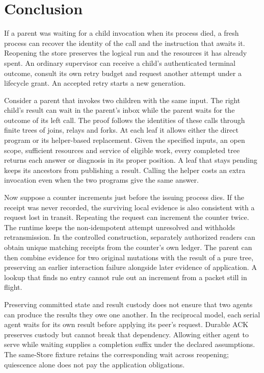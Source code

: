 \documentclass[11pt,a4paper]{article}
\theoremstyle{definition}
\theoremstyle{remark}
\begin{document}
\section{Conclusion}
If a parent was waiting for a child invocation when its process died, a fresh process can recover the identity of the call and the instruction that awaits it. Reopening the store preserves the logical run and the resources it has already spent. An ordinary supervisor can receive a child's authenticated terminal outcome, consult its own retry budget and request another attempt under a lifecycle grant. An accepted retry starts a new generation.

Consider a parent that invokes two children with the same input. The right child's result can wait in the parent's inbox while the parent waits for the outcome of its left call. The proof follows the identities of these calls through finite trees of joins, relays and forks. At each leaf it allows either the direct program or its helper-based replacement. Given the specified inputs, an open scope, sufficient resources and service of eligible work, every completed tree returns each answer or diagnosis in its proper position. A leaf that stays pending keeps its ancestors from publishing a result. Calling the helper costs an extra invocation even when the two programs give the same answer.

Now suppose a counter increments just before the issuing process dies. If the receipt was never recorded, the surviving local evidence is also consistent with a request lost in transit. Repeating the request can increment the counter twice. The runtime keeps the non-idempotent attempt unresolved and withholds retransmission. In the controlled construction, separately authorized readers can obtain unique matching receipts from the counter's own ledger. The parent can then combine evidence for two original mutations with the result of a pure tree, preserving an earlier interaction failure alongside later evidence of application. A lookup that finds no entry cannot rule out an increment from a packet still in flight.

Preserving committed state and result custody does not ensure that two agents can produce the results they owe one another. In the reciprocal model, each serial agent waits for its own result before applying its peer's request. Durable ACK preserves custody but cannot break that dependency. Allowing either agent to serve while waiting supplies a completion suffix under the declared assumptions. The same-Store fixture retains the corresponding wait across reopening; quiescence alone does not pay the application obligations.
\end{document}
